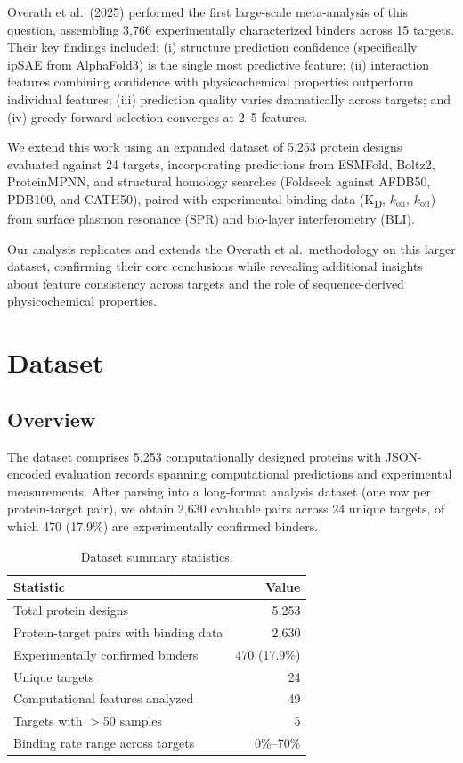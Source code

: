 \documentclass[11pt,a4paper]{article}
\newcommand{\KD}{K\textsubscript{D}}
\begin{document}
Overath et al.\ (2025) performed the first large-scale meta-analysis of this question, assembling 3,766 experimentally characterized binders across 15 targets.
Their key findings included: (i) structure prediction confidence (specifically ipSAE from AlphaFold3) is the single most predictive feature; (ii) interaction features combining confidence with physicochemical properties outperform individual features; (iii) prediction quality varies dramatically across targets; and (iv) greedy forward selection converges at 2--5 features.

We extend this work using an expanded dataset of 5,253 protein designs evaluated against 24 targets, incorporating predictions from ESMFold, Boltz2, ProteinMPNN, and structural homology searches (Foldseek against AFDB50, PDB100, and CATH50), paired with experimental binding data (\KD, $k_{\text{on}}$, $k_{\text{off}}$) from surface plasmon resonance (SPR) and bio-layer interferometry (BLI).

Our analysis replicates and extends the Overath et al.\ methodology on this larger dataset, confirming their core conclusions while revealing additional insights about feature consistency across targets and the role of sequence-derived physicochemical properties.

\section{Dataset}

\subsection{Overview}

The dataset comprises 5,253 computationally designed proteins with JSON-encoded evaluation records spanning computational predictions and experimental measurements.
After parsing into a long-format analysis dataset (one row per protein-target pair), we obtain 2,630 evaluable pairs across 24 unique targets, of which 470 (17.9\%) are experimentally confirmed binders.

\begin{table}[H]
\centering
\caption{Dataset summary statistics.}
\label{tab:dataset}
\begin{tabular}{lr}
\toprule
Statistic & Value \\
\midrule
Total protein designs & 5,253 \\
Protein-target pairs with binding data & 2,630 \\
Experimentally confirmed binders & 470 (17.9\%) \\
Unique targets & 24 \\
Computational features analyzed & 49 \\
Targets with $>$50 samples & 5 \\
Binding rate range across targets & 0\%--70\% \\
\bottomrule
\end{tabular}
\end{table}
\end{document}
